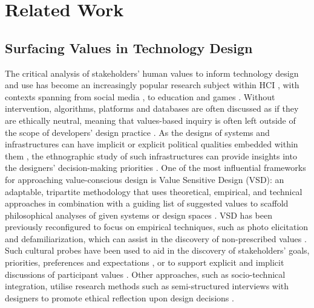 \section{Related Work}

\subsection{Surfacing Values in Technology Design}

The critical analysis of stakeholders' human values to inform technology design and use has become an increasingly popular research subject within HCI \cite{shilton2018}, with contexts spanning from social media \cite{DeVito2021}, to education \cite{richardson2017} and games \cite{flanagan2014}. Without intervention, algorithms, platforms and databases are often discussed as if they are ethically neutral, meaning that values-based inquiry is often left outside of the scope of developers' design practice \cite{Shilton2013}. As the designs of systems and infrastructures can have implicit or explicit political qualities embedded within them \cite{winner1980}, the ethnographic study of such infrastructures can provide insights into the designers' decision-making priorities \cite{Star1999}. One of the most influential frameworks for approaching value-conscious design is Value Sensitive Design (VSD): an adaptable, tripartite methodology that uses theoretical, empirical, and technical approaches in combination with a guiding list of suggested values to scaffold philosophical analyses of given systems or design spaces \cite{friedman2006}. VSD has been previously reconfigured to focus on empirical techniques, such as photo elicitation and defamiliarization, which can assist in the discovery of non-prescribed values \cite{LeDantec2009}. Such cultural probes have been used to aid in the discovery of stakeholders' goals, priorities, preferences and expectations \cite{flanagan2014, GrowAGame}, or to support explicit and implicit discussions of participant values \cite{Alshehri2020}. Other approaches, such as socio-technical integration, utilise research methods such as semi-structured interviews with designers to promote ethical reflection upon design decisions \cite{fisher2007}. 

